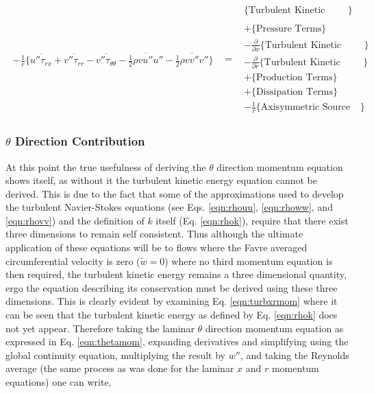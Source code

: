 \begin{equation}
\begin{array}{ccc}
\begin{array}{c}
	-\frac{1}{r}\Big\{\overline{u''\tau_{rx}} + \overline{v''\tau_{rr}} -\overline{v''\tau_{\theta \theta}}
	- \overline{\frac{1}{2} \rho v u'' u''} - \overline{\frac{1}{2} \rho v v''v''} \Big\}
      \end{array}
   & = & 
      \begin{array}{c}
	\Big\{\textrm{Turbulent Kinetic Energy Terms}\Big\} \\ \\
	+ \Big\{\textrm{Pressure Terms}\Big\} \\
	- \frac{\partial}{\partial x}\Big\{\textrm{Turbulent Kinetic Energy Flux Terms}\Big\} \\
	- \frac{\partial}{\partial r}\Big\{\textrm{Turbulent Kinetic Energy Flux Terms}\Big\} \\
	+ \Big\{\textrm{Production Terms}\Big\} \\
	+ \Big\{\textrm{Dissipation Terms}\Big\} \\
	- \frac{1}{r}\Big\{\textrm{Axisymmetric Source Terms}\}
      \end{array}	
   \end{array}		
\label{eqn:turbxrmom}
\end{equation}

\subsubsection{$\theta$ Direction Contribution}

	At this point the true usefulness of deriving the $\theta$ direction momentum equation shows itself, as without it
the turbulent kinetic energy equation cannot be derived.  This is due to the fact that some of the approximations used 
to develop the turbulent Navier-Stokes equations (see Eqs. \ref{eqn:rhouu}, \ref{eqn:rhoww}, and \ref{eqn:rhovv}) and the
definition of $k$ itself (Eq. \ref{eqn:rhok}), require that there exist three dimensions to remain 
self consistent.  Thus although the ultimate application of these equations will be to flows where the Favre averaged 
circumferential velocity is zero ($\tilde w = 0$) where no third momentum equation is then required, the turbulent kinetic
energy remains a three dimensional quantity, ergo the equation describing its conservation must be derived using these three
dimensions.  This is clearly evident by examining Eq. \ref{eqn:turbxrmom} where it can be seen that the turbulent 
kinetic energy as defined by Eq. \ref{eqn:rhok} does not yet appear.  Therefore taking the laminar $\theta$ direction 
momentum equation as expressed in Eq. \ref{eqn:thetamom}, expanding derivatives and simplifying using the global
continuity equation, multiplying the result by $w''$, and taking the Reynolds average (the same process as was done for the
laminar $x$ and $r$ momentum equations) one can write,

